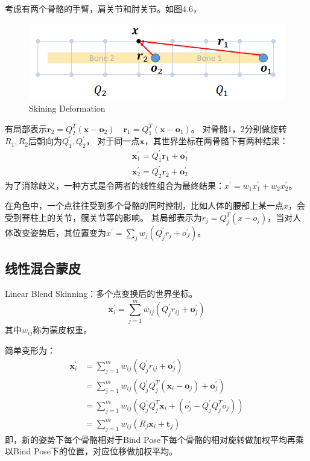 \documentclass[lang=cn,newtx,10pt,scheme=chinese]{elegantbook}
\begin{document}
考虑有两个骨骼的手臂，肩关节和肘关节。如图4.6，
\begin{figure}[htbp]
  \centering
  \includegraphics[totalheight=2in]{"./image/SkiningDeformation.png"}
  \caption{Skining Deformation} \label{fig:SkiningDeformation}
\end{figure}
有局部表示$\boldsymbol{r}_2=Q_2^T\left(\boldsymbol{x}-\boldsymbol{o}_2\right) \quad 
\boldsymbol{r}_1=Q_1^T\left(\boldsymbol{x}-\boldsymbol{o}_1\right)$。
对骨骼1，2分别做旋转$R_1, R_2$后朝向为$Q^{\prime}_1, Q^{\prime}_2$，
对于同一点$\boldsymbol{x}$，其世界坐标在两骨骼下有两种结果：
\begin{equation}
  \begin{aligned}
  & \boldsymbol{x}_1^{\prime}=Q_1^{\prime} \boldsymbol{r}_{\mathbf{1}}+\boldsymbol{o}_1^{\prime} \\
  & \boldsymbol{x}_2^{\prime}=Q_2^{\prime} \boldsymbol{r}_2+\boldsymbol{o}_2^{\prime}
  \end{aligned}
\end{equation}
为了消除歧义，一种方式是令两者的线性组合为最终结果：$x^{\prime}=w_1 x^{\prime}_1 + w_2 x^{\prime}_2$。

在角色中，一个点往往受到多个骨骼的同时控制，比如人体的腰部上某一点$x$，会受到脊柱上的关节，髋关节等的影响。
其局部表示为$r_j = Q_{j}^{T}(x - o_j)$，当对人体改变姿势后，其位置变为$x^{\prime} = \sum_{j}w_j(Q^{\prime}_j r_j + o^{\prime}_J)$。

\subsection{线性混合蒙皮}
Linear Blend Skinning：多个点变换后的世界坐标。
\begin{equation}
  \boldsymbol{x}_i^{\prime}=\sum_{j=1}^m w_{i j}\left(Q_j^{\prime} r_{i j}+\boldsymbol{o}_j^{\prime}\right)
\end{equation}
其中$w_{ij}$称为蒙皮权重。

简单变形为：
\begin{equation}
  \label{f:LBS}
  \begin{aligned}
  \boldsymbol{x}_i^{\prime} & =\sum_{j=1}^m w_{i j}\left(Q_j^{\prime} r_{i j}+\boldsymbol{o}_j^{\prime}\right) \\
  & =\sum_{j=1}^m w_{i j}\left(Q_j^{\prime} Q_j^T\left(\boldsymbol{x}_i-\boldsymbol{o}_j\right)+\boldsymbol{o}_j^{\prime}\right) \\
  & =\sum_{j=1}^m w_{i j}\left(Q_j^{\prime} Q_j^T \boldsymbol{x}_i+\left(o_j^{\prime}-Q_j^{\prime} Q_j^T o_j\right)\right) \\
  & =\sum_{j=1}^m w_{i j}\left(R_j \boldsymbol{x}_i+\boldsymbol{t}_j\right)
  \end{aligned}
\end{equation}
即，新的姿势下每个骨骼相对于Bind Pose下每个骨骼的相对旋转做加权平均再乘以Bind Pose下的位置，对应位移做加权平均。
\end{document}
